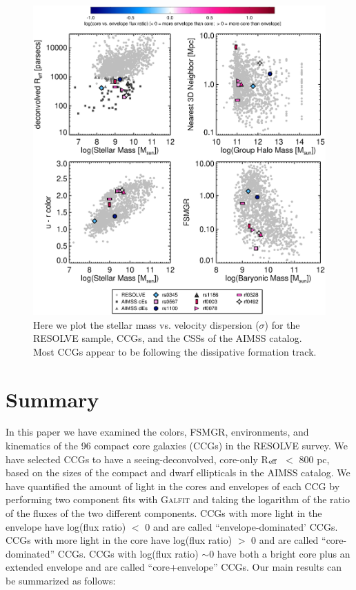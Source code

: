 \documentclass[iop,apj]{emulateapj}
\newcommand{\Reff}{R$_{\rm eff}$}
\begin{document}
\begin{figure}[b]
\begin{center}
\includegraphics[scale=0.7]{miniplots.eps}
\caption{Here we plot the stellar mass vs. velocity dispersion ($\sigma$) for the RESOLVE sample, CCGs, and the CSSs of the AIMSS catalog. Most CCGs appear to be following the dissipative formation track.}
\label{fig:sigma}
\end{center}
\end{figure}


\section{Summary}
\label{conclusions}

\noindent In this paper we have examined the colors, FSMGR, environments, and kinematics of the 96 compact core galaxies (CCGs) in the RESOLVE survey. We have selected CCGs to have a seeing-deconvolved, core-only \Reff\ $<$ 800 pc, based on the sizes of the compact and dwarf ellipticals in the AIMSS catalog. We have quantified the amount of light in the cores and envelopes of each CCG by performing two component fits with \textsc{Galfit} and taking the logarithm of the ratio of the fluxes of the two different components. CCGs with more light in the envelope have log(flux ratio) $<$ 0 and are called ``envelope-dominated' CCGs. CCGs with more light in the core have log(flux ratio) $>$ 0 and are called ``core-dominated'' CCGs. CCGs with log(flux ratio) $\sim 0$ have both a bright core plus an extended envelope and are called ``core+envelope'' CCGs. Our main results can be summarized as follows:
\end{document}
